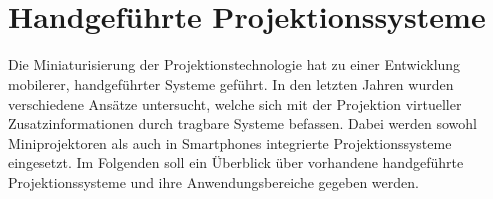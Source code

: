 
\\%
\\





\section{Handgeführte Projektionssysteme}

Die Miniaturisierung der Projektionstechnologie hat zu einer Entwicklung mobilerer, handgeführter Systeme geführt. In den letzten Jahren wurden verschiedene Ansätze untersucht, welche sich mit der Projektion virtueller Zusatzinformationen durch tragbare Systeme befassen. Dabei werden sowohl Miniprojektoren als auch in Smartphones integrierte Projektionssysteme eingesetzt. Im Folgenden soll ein Überblick über vorhandene handgeführte Projektionssysteme und ihre Anwendungsbereiche gegeben werden.\\

